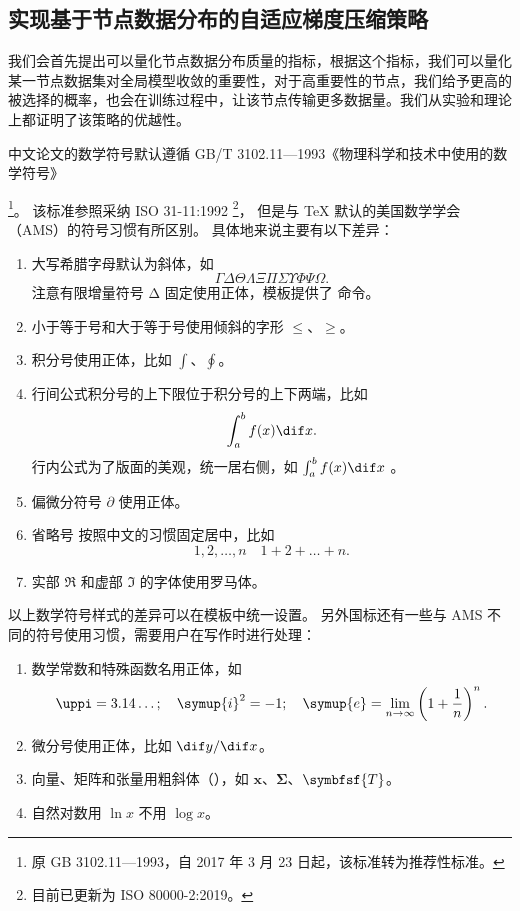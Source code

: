 \subsection{实现基于节点数据分布的自适应梯度压缩策略}

我们会首先提出可以量化节点数据分布质量的指标，根据这个指标，我们可以量化某一节点数据集对全局模型收敛的重要性，对于高重要性的节点，我们给予更高的被选择的概率，也会在训练过程中，让该节点传输更多数据量。我们从实验和理论上都证明了该策略的优越性。


\iffalse
中文论文的数学符号默认遵循 GB/T 3102.11—1993《物理科学和技术中使用的数学符号》

\footnote{原 GB 3102.11—1993，自 2017 年 3 月 23 日起，该标准转为推荐性标准。}。
该标准参照采纳 ISO 31-11:1992 \footnote{目前已更新为 ISO 80000-2:2019。}，
但是与 \TeX{} 默认的美国数学学会（AMS）的符号习惯有所区别。
具体地来说主要有以下差异：
\begin{enumerate}
  \item 大写希腊字母默认为斜体，如
    \begin{equation*}
      \Gamma \Delta \Theta \Lambda \Xi \Pi \Sigma \Upsilon \Phi \Psi \Omega.
    \end{equation*}
    注意有限增量符号 $\increment$ 固定使用正体，模板提供了  命令。
  \item 小于等于号和大于等于号使用倾斜的字形 $\le$、$\ge$。
  \item 积分号使用正体，比如 $\int$、$\oint$。
  \item 行间公式积分号的上下限位于积分号的上下两端，比如
    \begin{equation*}
      \int_a^b f(x) \dif x.
    \end{equation*}
    行内公式为了版面的美观，统一居右侧，如 $\int_a^b f(x) \dif x$ 。
  \item
    偏微分符号 $\partial$ 使用正体。
  \item
    省略号  按照中文的习惯固定居中，比如
    \begin{equation*}
      1, 2, \dots, n \quad 1 + 2 + \dots + n.
    \end{equation*}
  \item
    实部 $\Re$ 和虚部 $\Im$ 的字体使用罗马体。
\end{enumerate}

以上数学符号样式的差异可以在模板中统一设置。
另外国标还有一些与 AMS 不同的符号使用习惯，需要用户在写作时进行处理：
\begin{enumerate}
  \item 数学常数和特殊函数名用正体，如
    \begin{equation*}
      \uppi = 3.14\dots; \quad
      \symup{i}^2 = -1; \quad
      \symup{e} = \lim_{n \to \infty} \left( 1 + \frac{1}{n} \right)^n.
    \end{equation*}
  \item 微分号使用正体，比如 $\dif y / \dif x$。
  \item 向量、矩阵和张量用粗斜体（），如 $\symbf{x}$、$\symbf{\Sigma}$、$\symbfsf{T}$。
  \item 自然对数用 $\ln x$ 不用 $\log x$。
\end{enumerate}


